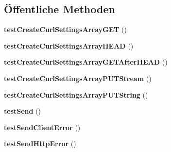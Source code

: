 \subsection*{Öffentliche Methoden}
\begin{DoxyCompactItemize}
\item 
\mbox{\label{class_sabre_1_1_h_t_t_p_1_1_client_test_a9586735a9ba2406396617e04b1d65247}} 
{\bfseries test\+Create\+Curl\+Settings\+Array\+G\+ET} ()
\item 
\mbox{\label{class_sabre_1_1_h_t_t_p_1_1_client_test_aa3b81e0d2f7449a6d5859b89afd566db}} 
{\bfseries test\+Create\+Curl\+Settings\+Array\+H\+E\+AD} ()
\item 
\mbox{\label{class_sabre_1_1_h_t_t_p_1_1_client_test_a33233477405898eb13fd54b55ad36843}} 
{\bfseries test\+Create\+Curl\+Settings\+Array\+G\+E\+T\+After\+H\+E\+AD} ()
\item 
\mbox{\label{class_sabre_1_1_h_t_t_p_1_1_client_test_a53edac3dc18ca1aa5581812f692971f6}} 
{\bfseries test\+Create\+Curl\+Settings\+Array\+P\+U\+T\+Stream} ()
\item 
\mbox{\label{class_sabre_1_1_h_t_t_p_1_1_client_test_a57ec88660413deb2d25a7cf3b95312cf}} 
{\bfseries test\+Create\+Curl\+Settings\+Array\+P\+U\+T\+String} ()
\item 
\mbox{\label{class_sabre_1_1_h_t_t_p_1_1_client_test_a7fe59a55df844189a20a86d9d7720486}} 
{\bfseries test\+Send} ()
\item 
\mbox{\label{class_sabre_1_1_h_t_t_p_1_1_client_test_a56bd76dc42a6f0208aa6b4002c0c2225}} 
{\bfseries test\+Send\+Client\+Error} ()
\item 
\mbox{\label{class_sabre_1_1_h_t_t_p_1_1_client_test_ab0143886c915d9474953719705e99dfb}} 
{\bfseries test\+Send\+Http\+Error} ()
\item 
\mbox{\label{class_sabre_1_1_h_t_t_p_1_1_client_test_a1fe45eb529073f314b641b830be50157}} 

\end{DoxyCompactItemize}
